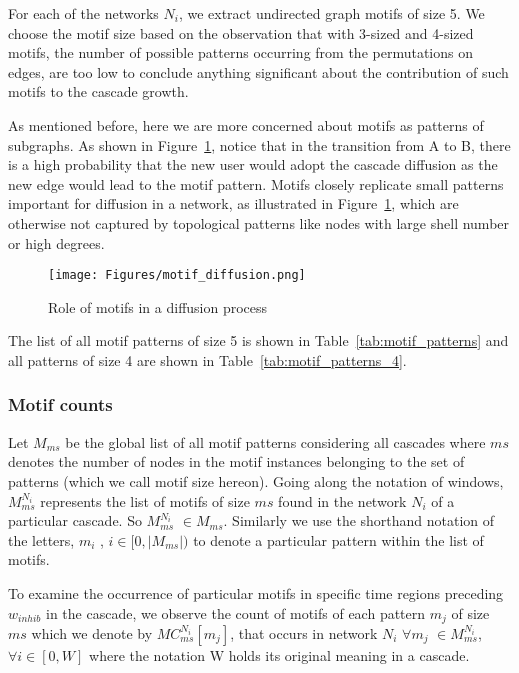 \documentclass[smallextended]{svjour3}       %
\theoremstyle{definition}
\begin{document}
For each of the networks  $N_i$, we extract undirected graph motifs of size 5. We choose the motif size based on the observation that with 3-sized and 4-sized motifs, the number of possible patterns occurring from the permutations on edges, are too low to conclude anything significant about the contribution of such motifs to the cascade growth. 

As mentioned before, here we are more concerned about motifs as patterns of subgraphs. As shown in Figure~\ref{fig:motif_diffusion}, notice that in the transition from A to B, there is a high probability that the new user would adopt the cascade diffusion as the new edge would lead to the motif pattern. Motifs closely replicate small patterns important for diffusion in a network, as illustrated in Figure~\ref{fig:motif_diffusion}, which are otherwise not captured by topological patterns like nodes with large shell number or high degrees.

\begin{figure}[t!]
	\centering
	\texttt{[image: Figures/motif\_diffusion.png]}
	\caption{Role of motifs in a diffusion process}
	\label{fig:motif_diffusion}
\end{figure}

The list of all motif patterns of size 5 is shown in Table~\ref{tab:motif_patterns} and all patterns of size 4 are shown in Table~\ref{tab:motif_patterns_4}.

\subsubsection{Motif counts}
  Let $M_{ms}$ be the global list of all motif patterns considering all cascades where $ms$ denotes the number of nodes in the motif instances belonging to the set of patterns (which we call motif size hereon). Going along the notation of windows, $M_{ms}^{N_i} $ represents the list of motifs of size $ms$ found in the network $N_i $ of a particular cascade. So $M_{ms}^{N_i} $ $\in M_{ms}$. Similarly we use the shorthand notation of the letters, $m_i$ , $i \in [0, |M_{ms}|) $ to denote a particular pattern within the list of motifs.

To examine the occurrence of particular motifs in specific time regions preceding $w_{inhib}$ in the cascade, we observe the count of motifs of each pattern $m_j$ of size $ms$ which we denote by $MC^{N_i}_{ms}[m_j]$, that occurs in network $N_i $ $\forall m_j$ $\in M_{ms}^{N_i} $, $\forall i \in [0, W] $ where the notation W holds its original meaning in a cascade.
\end{document}

